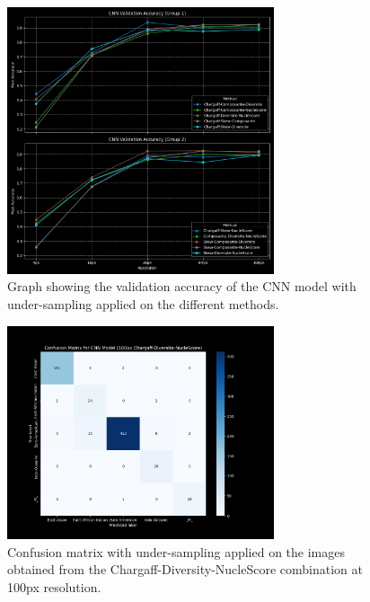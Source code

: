 \begin{appendices}
	\begin{figure}[H]
		\centering
		\includegraphics[width=0.7\textwidth]{../imgs/graphs/kfold-undersample/cnn_validation_accuracy_groups_mask_5_kfold_undersample.png}
		\caption{Graph showing the validation accuracy of the CNN model with under-sampling applied on the different methods.}
		\label{fig:under_sampling_accuracy}
	\end{figure}

	\begin{figure}[H]
		\centering
		\includegraphics[width=0.7\textwidth]{../imgs/graphs/kfold-undersample/cnn_confusion_matrix_100px_mask_5-kfold_undersample.png}
		\caption{Confusion matrix with under-sampling applied on the images obtained from the Chargaff-Diversity-NucleScore
			combination at 100px resolution.}
		\label{fig:under_sampling_confusion_matrix}
	\end{figure}


\end{appendices}
